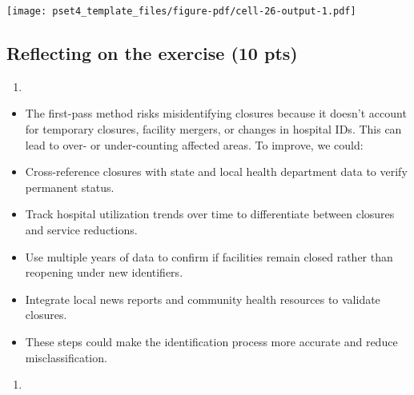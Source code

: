 \documentclass[
  letterpaper,
  DIV=11,
  numbers=noendperiod]{scrartcl}
\providecommand{\tightlist}{%
  \setlength{\itemsep}{0pt}\setlength{\parskip}{0pt}}\usepackage{longtable,booktabs,array}
\begin{document}
\texttt{[image: pset4\_template\_files/figure-pdf/cell-26-output-1.pdf]}

\subsection{Reflecting on the exercise (10
pts)}\label{reflecting-on-the-exercise-10-pts}

\begin{enumerate}
\def\labelenumi{\arabic{enumi}.}
\tightlist
\item
\end{enumerate}

\begin{itemize}
\tightlist
\item
  The first-pass method risks misidentifying closures because it doesn't
  account for temporary closures, facility mergers, or changes in
  hospital IDs. This can lead to over- or under-counting affected areas.
  To improve, we could:
\item
  Cross-reference closures with state and local health department data
  to verify permanent status.
\item
  Track hospital utilization trends over time to differentiate between
  closures and service reductions.
\item
  Use multiple years of data to confirm if facilities remain closed
  rather than reopening under new identifiers.
\item
  Integrate local news reports and community health resources to
  validate closures.
\item
  These steps could make the identification process more accurate and
  reduce misclassification.
\end{itemize}

\begin{enumerate}
\def\labelenumi{\arabic{enumi}.}
\setcounter{enumi}{1}
\tightlist
\item
\end{enumerate}
\end{document}
